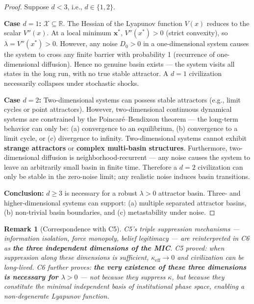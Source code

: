 \documentclass[12pt,a4paper]{article}
\newtheorem{remark}[theorem]{Remark}
\theoremstyle{definition}
\newcommand{\coupling}{\kappa}
\newcommand{\R}{\mathbb{R}}
\newcommand{\calX}{\mathcal{X}}
\newcommand{\lb}{\lambda}
\newcommand{\Lyap}{V}
\begin{document}
\begin{proof}
Suppose $d < 3$, i.e., $d \in \{1, 2\}$.

\textbf{Case $d=1$:} $\calX \subseteq \R$. The Hessian of the Lyapunov function $\Lyap(x)$ reduces to the scalar $\Lyap''(x)$. At a local minimum $\mathbf{x}^*$, $\Lyap''(x^*) > 0$ (strict convexity), so $\lb = \Lyap''(x^*) > 0$. However, any noise $D_0 > 0$ in a one-dimensional system causes the system to cross any finite barrier with probability 1 (recurrence of one-dimensional diffusion). Hence no genuine basin exists --- the system visits all states in the long run, with no true stable attractor. A $d=1$ civilization necessarily collapses under stochastic shocks.

\textbf{Case $d=2$:} Two-dimensional systems can possess stable attractors (e.g., limit cycles or point attractors). However, two-dimensional continuous dynamical systems are constrained by the Poincar\'{e}--Bendixson theorem --- the long-term behavior can only be: (a) convergence to an equilibrium, (b) convergence to a limit cycle, or (c) divergence to infinity. Two-dimensional systems cannot exhibit \textbf{strange attractors} or \textbf{complex multi-basin structures}. Furthermore, two-dimensional diffusion is neighborhood-recurrent --- any noise causes the system to leave an arbitrarily small basin in finite time. Therefore a $d=2$ civilization can only be stable in the zero-noise limit; any realistic noise induces basin transitions.

\textbf{Conclusion:} $d \geq 3$ is necessary for a robust $\lb>0$ attractor basin. Three- and higher-dimensional systems can support: (a) multiple separated attractor basins, (b) non-trivial basin boundaries, and (c) metastability under noise.
\end{proof}

\begin{remark}[Correspondence with C5]
C5's triple suppression mechanisms --- information isolation, force monopoly, belief legitimacy --- are reinterpreted in C6 as \textbf{the three independent dimensions of the MIC}. C5 proved: when suppression along these dimensions is sufficient, $\coupling_{\text{eff}} \to 0$ and civilization can be long-lived. C6 further proves: \textbf{the very existence of these three dimensions is necessary for $\lb>0$} --- not because they suppress $\coupling$, but because they constitute the minimal independent basis of institutional phase space, enabling a non-degenerate Lyapunov function.
\end{remark}
\end{document}
